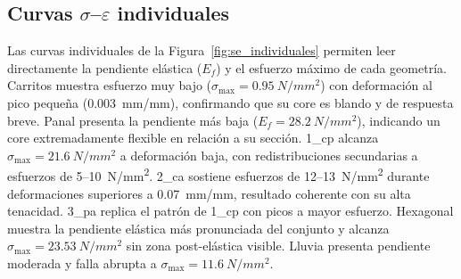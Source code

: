 \documentclass[12pt, a4paper, twocolumn]{article}
\begin{document}
\subsection{Curvas $\sigma$--$\varepsilon$ individuales}

Las curvas individuales de la Figura~\ref{fig:se_individuales} permiten leer
directamente la pendiente elástica ($E_f$) y el esfuerzo máximo de cada geometría.
Carritos muestra esfuerzo muy bajo ($\sigma_\text{max}=\SI{0.95}{N/mm^2}$) con
deformación al pico pequeña (\SI{0.003}{mm/mm}), confirmando que su core es blando
y de respuesta breve. Panal presenta la pendiente más baja ($E_f=\SI{28.2}{N/mm^2}$),
indicando un core extremadamente flexible en relación a su sección. 1\_cp alcanza
$\sigma_\text{max}=\SI{21.6}{N/mm^2}$ a deformación baja, con redistribuciones
secundarias a esfuerzos de \SI{5}{}--\SI{10}{N/mm^2}. 2\_ca sostiene esfuerzos de
\SI{12}{}--\SI{13}{N/mm^2} durante deformaciones superiores a \SI{0.07}{mm/mm},
resultado coherente con su alta tenacidad. 3\_pa replica el patrón de 1\_cp con
picos a mayor esfuerzo. Hexagonal muestra la pendiente elástica más pronunciada
del conjunto y alcanza $\sigma_\text{max}=\SI{23.53}{N/mm^2}$ sin zona post-elástica
visible. Lluvia presenta pendiente moderada y falla abrupta a
$\sigma_\text{max}=\SI{11.6}{N/mm^2}$.
\end{document}
